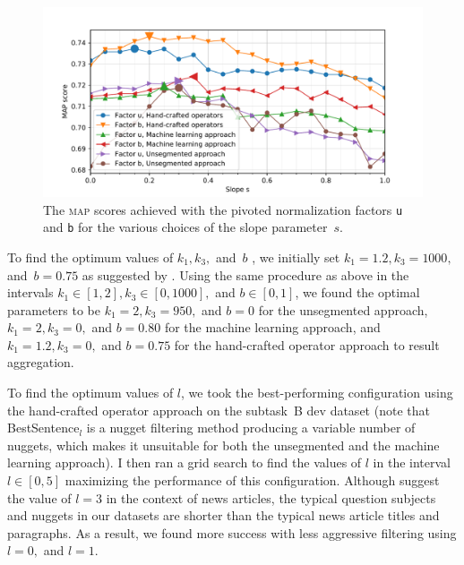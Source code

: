 \documentclass[
  digital, %
  notable, %
  lof,     %
  lot,     %
  nopalatino, color
]{fithesis3}
\def\abbr#1{\textsc{\MakeLowercase{#1}}}
\begin{document}
\begin{figure}[tb]
\centering%
\includegraphics[trim={1.2cm 0.2cm 1.9cm 1.2cm}, scale=0.69]{figs/tfidf}
\caption[The \abbr{MAP} scores achieved with the pivoted normalization factors
\texttt{u} and \texttt{b} for the various choices of the slope parameter~$s$]{%
  The \abbr{MAP} scores achieved with the pivoted normalization factors
  \texttt{u} and \texttt{b} for the
  various choices of the slope parameter~$s$.}
\label{fig:segmentation-slope-optimization}
\end{figure}

To find the optimum values of $k_1,k_3,$ and~$b$%
, we initially set $k_1=1.2,k_3=1000,$
and~$b=0.75$ as suggested by \textcite{singhal01}.
Using the same procedure as above in the intervals $k_1\in[1,2],
k_3\in[0,1000],$ and $b\in[0,1]$, we found the optimal
parameters to be $k_1=2,k_3=950,$ and $b=0$ for the unsegmented approach,
$k_1=2,k_3=0,$ and $b=0.80$ for the machine learning approach, and
$k_1=1.2,k_3=0,$ and $b=0.75$ for the hand-crafted operator approach to result
aggregation.

To find the optimum values of $l$, we took the
best-performing configuration using the hand-crafted operator approach on the
subtask~B dev dataset (note that
BestSentence$_l$ is a nugget
filtering method producing a variable number of
nuggets, which makes it unsuitable for both the unsegmented and the machine
learning approach). I then ran a grid search to find the values of $l$ in the
interval $l\in[0,5]$ maximizing the performance of this configuration. Although
\textcite{kolczetal00} suggest the value of $l=3$ in the context of news
articles, the typical question subjects and nuggets in our
datasets are shorter than the typical news article titles and paragraphs. As a
result, we found more success with less aggressive filtering using $l=0,$ and
$l=1$.
\end{document}
